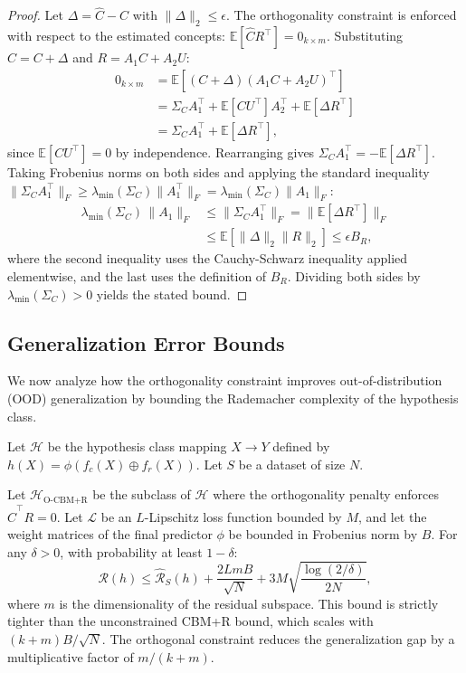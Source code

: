 \documentclass[twoside,11pt]{article}
\begin{document}
\begin{proof}
Let $\Delta = \hat{C} - C$ with $\|\Delta\|_2 \leq \epsilon$. The orthogonality constraint is enforced with respect to the estimated concepts: $\mathbb{E}[\hat{C} R^\top] = 0_{k \times m}$. Substituting $\hat{C} = C + \Delta$ and $R = A_1 C + A_2 U$:
\begin{align*}
    0_{k \times m} &= \mathbb{E}[(C + \Delta)(A_1 C + A_2 U)^\top] \\
    &= \Sigma_C A_1^\top + \mathbb{E}[C U^\top] A_2^\top + \mathbb{E}[\Delta R^\top] \\
    &= \Sigma_C A_1^\top + \mathbb{E}[\Delta R^\top],
\end{align*}
since $\mathbb{E}[C U^\top] = 0$ by independence. Rearranging gives $\Sigma_C A_1^\top = -\mathbb{E}[\Delta R^\top]$. Taking Frobenius norms on both sides and applying the standard inequality $\|\Sigma_C A_1^\top\|_F \geq \lambda_{\min}(\Sigma_C) \|A_1^\top\|_F = \lambda_{\min}(\Sigma_C)\|A_1\|_F$:
\begin{align*}
    \lambda_{\min}(\Sigma_C)\,\|A_1\|_F &\leq \|\Sigma_C A_1^\top\|_F = \|\mathbb{E}[\Delta R^\top]\|_F \\
    &\leq \mathbb{E}[\|\Delta\|_2 \|R\|_2] \leq \epsilon B_R,
\end{align*}
where the second inequality uses the Cauchy-Schwarz inequality applied elementwise, and the last uses the definition of $B_R$. Dividing both sides by $\lambda_{\min}(\Sigma_C) > 0$ yields the stated bound.
\end{proof}

\subsection{Generalization Error Bounds}

We now analyze how the orthogonality constraint improves out-of-distribution (OOD) generalization by bounding the Rademacher complexity of the hypothesis class. 

Let $\mathcal{H}$ be the hypothesis class mapping $X \rightarrow Y$ defined by $h(X) = \phi(f_c(X) \oplus f_r(X))$. Let $S$ be a dataset of size $N$.

\begin{theorem}
\label{thm:generalization}
Let $\mathcal{H}_{\text{O-CBM+R}}$ be the subclass of $\mathcal{H}$ where the orthogonality penalty enforces $\hat{C}^\top R = 0$. Let $\mathcal{L}$ be an $L$-Lipschitz loss function bounded by $M$, and let the weight matrices of the final predictor $\phi$ be bounded in Frobenius norm by $B$. For any $\delta > 0$, with probability at least $1 - \delta$:
\begin{equation}
    \mathcal{R}(h) \leq \hat{\mathcal{R}}_S(h) + \frac{2LmB}{\sqrt{N}} + 3M \sqrt{\frac{\log(2/\delta)}{2N}},
\end{equation}
where $m$ is the dimensionality of the residual subspace. This bound is strictly tighter than the unconstrained CBM+R bound, which scales with $(k+m)B/\sqrt{N}$. The orthogonal constraint reduces the generalization gap by a multiplicative factor of $m/(k+m)$.
\end{theorem}
\end{document}
